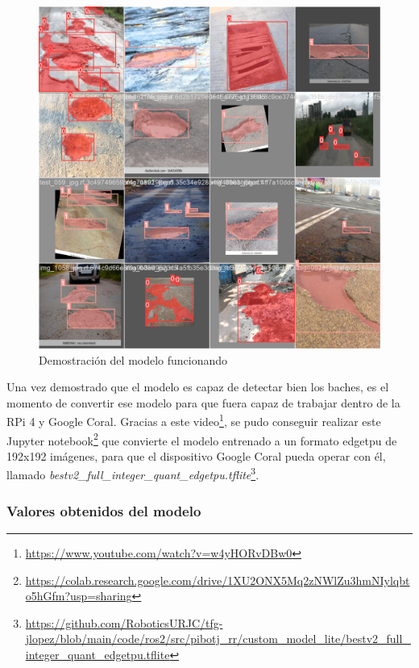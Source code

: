  \begin{figure} [h!]
	\begin{center}
		\includegraphics[width=15cm]{figs/cap6/train_results.jpg}
	\end{center}
	\caption{Demostración del modelo funcionando}
	\label{fig:trainex}
\end{figure}

Una vez demostrado que el modelo es capaz de detectar bien los baches, es el momento de convertir ese modelo para que fuera capaz de trabajar dentro de la RPi 4 y Google Coral. Gracias a este video\footnote{\url{https://www.youtube.com/watch?v=w4yHORvDBw0}}, se pudo conseguir realizar este Jupyter notebook\footnote{\url{https://colab.research.google.com/drive/1XU2ONX5Mq2zNWlZu3hmNIylqbto5hGfm?usp=sharing}} que convierte el modelo entrenado a un formato edgetpu de 192x192 imágenes, para que el dispositivo Google Coral pueda operar con él, llamado \textit{bestv2\_full\_integer\_quant\_edgetpu.tflite}\footnote{\url{https://github.com/RoboticsURJC/tfg-jlopez/blob/main/code/ros2/src/pibotj_rr/custom_model_lite/bestv2_full_integer_quant_edgetpu.tflite}}.

\subsubsection{Valores obtenidos del modelo}
\label{subsec:valoresmodelotflite}

